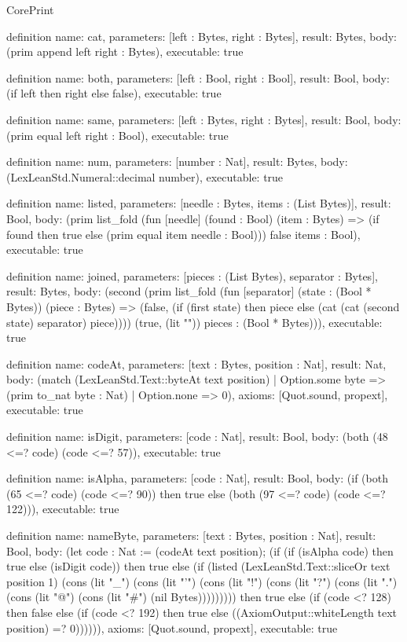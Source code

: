 \begin{lexlean}{CorePrint}
\begin{semanticmodule}
definition{
  name: cat,
  parameters: [left : Bytes, right : Bytes],
  result: Bytes,
  body: (prim append left right : Bytes),
  executable: true
}

definition{
  name: both,
  parameters: [left : Bool, right : Bool],
  result: Bool,
  body: (if left then right else false),
  executable: true
}

definition{
  name: same,
  parameters: [left : Bytes, right : Bytes],
  result: Bool,
  body: (prim equal left right : Bool),
  executable: true
}

definition{
  name: num,
  parameters: [number : Nat],
  result: Bytes,
  body: (LexLeanStd.Numeral::decimal number),
  executable: true
}

definition{
  name: listed,
  parameters: [needle : Bytes, items : (List Bytes)],
  result: Bool,
  body: (prim list_fold (fun [needle] (found : Bool) (item : Bytes) => (if found then true else (prim equal item needle : Bool))) false items : Bool),
  executable: true
}

definition{
  name: joined,
  parameters: [pieces : (List Bytes), separator : Bytes],
  result: Bytes,
  body: (second (prim list_fold (fun [separator] (state : (Bool * Bytes)) (piece : Bytes) => (false, (if (first state) then piece else (cat (cat (second state) separator) piece)))) (true, (lit "")) pieces : (Bool * Bytes))),
  executable: true
}

definition{
  name: codeAt,
  parameters: [text : Bytes, position : Nat],
  result: Nat,
  body: (match (LexLeanStd.Text::byteAt text position)
    | Option.some byte => (prim to_nat byte : Nat)
    | Option.none => 0),
  axioms: [Quot.sound, propext],
  executable: true
}

definition{
  name: isDigit,
  parameters: [code : Nat],
  result: Bool,
  body: (both (48 <=? code) (code <=? 57)),
  executable: true
}

definition{
  name: isAlpha,
  parameters: [code : Nat],
  result: Bool,
  body: (if (both (65 <=? code) (code <=? 90)) then true else (both (97 <=? code) (code <=? 122))),
  executable: true
}

definition{
  name: nameByte,
  parameters: [text : Bytes, position : Nat],
  result: Bool,
  body: (let code : Nat := (codeAt text position); (if (if (isAlpha code) then true else (isDigit code)) then true else (if (listed (LexLeanStd.Text::sliceOr text position 1) (cons (lit "_") (cons (lit "'") (cons (lit "!") (cons (lit "?") (cons (lit ".") (cons (lit "@") (cons (lit "#") (nil Bytes))))))))) then true else (if (code <? 128) then false else (if (code <? 192) then true else ((AxiomOutput::whiteLength text position) =? 0)))))),
  axioms: [Quot.sound, propext],
  executable: true
}


\end{semanticmodule}
\end{lexlean}
